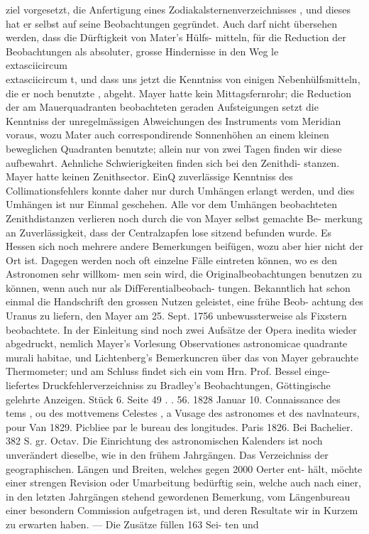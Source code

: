 \documentclass[12pt,a4paper]{article}
\begin{document}
{{{{{{{{ziel  vorgesetzt,  die  Anfertigung  eines  Zodiakalsternenverzeichnisses ,  und  dieses  hat  er  selbst  auf  seine Beobachtungen  gegründet.  Auch  darf  nicht  übersehen  werden,  dass  die  Dürftigkeit  von  Mater's  Hülfs- mitteln,  für  die  Reduction  der  Beobachtungen  als  absoluter,  grosse  Hindernisse  in  den  Weg  le\\	extasciicircum{}{ }{ }\\	extasciicircum{}{ }{ }t,  und dass  uns  jetzt  die  Kenntniss  von  einigen  Nebenhülfsmitteln,  die  er  noch  benutzte ,  abgeht.  Mayer  hatte kein  Mittagsfernrohr;  die  Reduction  der  am  Mauerquadranten  beobachteten  geraden  Aufsteigungen  setzt die  Kenntniss  der  unregelmässigen  Abweichungen  des  Instruments  vom  Meridian  voraus,  wozu  Mater auch  correspondirende  Sonnenhöhen  an  einem  kleinen  beweglichen  Quadranten  benutzte;  allein  nur von  zwei  Tagen  finden  wir  diese  aufbewahrt.  Aehnliche  Schwierigkeiten  finden  sich  bei  den  Zenithdi- stanzen.  Mayer  hatte  keinen  Zenithsector.  EinQ  zuverlässige  Kenntniss  des  Collimationsfehlers  konnte daher  nur  durch  Umhängen  erlangt  werden,  und  dies  Umhängen  ist  nur  Einmal  geschehen.  Alle  vor dem  Umhängen  beobachteten  Zenithdistanzen  verlieren  noch  durch  die  von  Mayer  selbst  gemachte  Be- merkung an  Zuverlässigkeit,  dass  der  Centralzapfen  lose  sitzend  befunden  wurde.  Es  Hessen  sich  noch mehrere  andere  Bemerkungen  beifügen,  wozu  aber  hier  nicht  der  Ort  ist. Dagegen  werden  noch  oft  einzelne  Fälle  eintreten  können,  wo  es  den  Astronomen  sehr  willkom- men sein  wird,  die  Originalbeobachtungen  benutzen  zu  können,  wenn  auch  nur  als  DifFerentialbeobach- tungen.  Bekanntlich  hat  schon  einmal  die  Handschrift  den  grossen  Nutzen  geleistet,  eine  frühe  Beob- achtung des  Uranus  zu  liefern,  den  Mayer  am  25.  Sept.  1756  unbewussterweise  als  Fixstern  beobachtete. In  der  Einleitung  sind  noch  zwei  Aufsätze  der  Opera  inedita  wieder  abgedruckt,  nemlich  Mayer's Vorlesung  Observationes  astronomicae  quadrante  murali  habitae,  und  Lichtenberg's  Bemerkuncren  über das  von  Mayer  gebrauchte  Thermometer;  und  am  Schluss  findet  sich  ein  vom  Hrn.  Prof.  Bessel  einge- liefertes Druckfehlerverzeichniss  zu  Bradley's  Beobachtungen, Göttingische  gelehrte  Anzeigen.     Stück  6.     Seite  49 . .  56.     1828  Januar  10. Connaissance  des  tems ,  ou  des  mottvemens  Celestes ,  a  Vusage  des  astronomes  et  des  navlnateurs,  pour Van  1829.     Picbliee  par  le  bureau  des  longitudes.     Paris  1826.     Bei  Bachelier.     382  S.     gr.  Octav. Die  Einrichtung  des  astronomischen  Kalenders  ist  noch  unverändert  dieselbe,  wie  in  den  frühem Jahrgängen.  Das  Verzeichniss  der  geographischen. Längen  und  Breiten,  welches  gegen  2000  Oerter  ent- hält, möchte  einer  strengen  Revision  oder  Umarbeitung  bedürftig  sein,  welche  auch  nach  einer,  in  den letzten  Jahrgängen  stehend  gewordenen  Bemerkung,  vom  Längenbureau  einer  besondern  Commission aufgetragen  ist,  und  deren  Resultate  wir  in  Kurzem  zu  erwarten  haben.  ---  Die  Zusätze  füllen  163  Sei- ten und  }}}}}}}}
\end{document}

